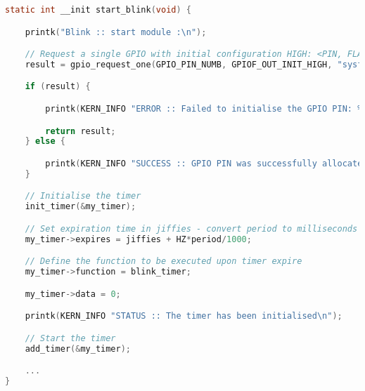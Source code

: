 \documentclass[a4paper,oneside,onecolumn]{article}
\begin{document}
\begin{lstlisting}[language=c, label={lst:initial_blink}, caption={Initial configuration of LED}]
static int __init start_blink(void) {

    printk("Blink :: start module :\n");

    // Request a single GPIO with initial configuration HIGH: <PIN, FLAGS, label>
    result = gpio_request_one(GPIO_PIN_NUMB, GPIOF_OUT_INIT_HIGH, "sysfs");

    if (result) {

        printk(KERN_INFO "ERROR :: Failed to initialise the GPIO PIN: %d\n", GPIO_PIN_NUMB);

        return result;
    } else {

        printk(KERN_INFO "SUCCESS :: GPIO PIN was successfully allocated\n");
    }

    // Initialise the timer
    init_timer(&my_timer);

    // Set expiration time in jiffies - convert period to milliseconds
    my_timer->expires = jiffies + HZ*period/1000;

    // Define the function to be executed upon timer expire
    my_timer->function = blink_timer;

    my_timer->data = 0;

    printk(KERN_INFO "STATUS :: The timer has been initialised\n");

    // Start the timer
    add_timer(&my_timer);

    ...
}
\end{lstlisting}
\end{document}
